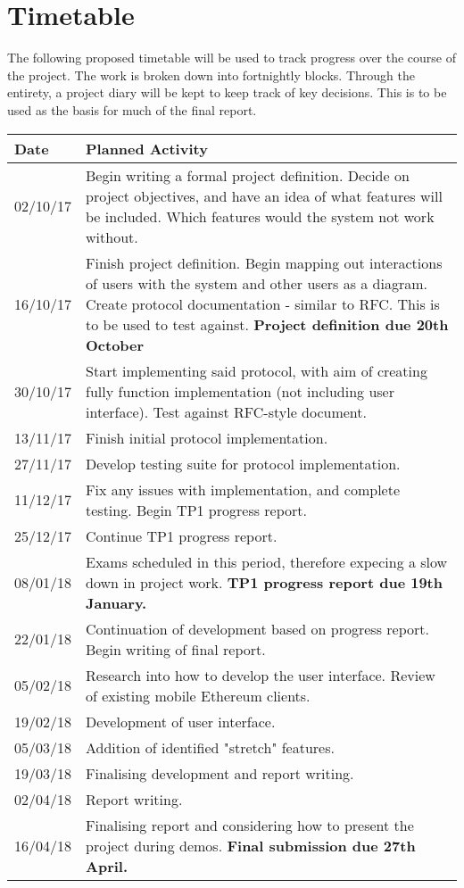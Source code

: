 \documentclass{article}
\begin{document}
\pagebreak

\section{Timetable}

The following proposed timetable will be used to track progress over the course of the project. The work is broken down into fortnightly blocks. Through the entirety, a project diary will be kept to keep track of key decisions. This is to be used as the basis for much of the final report.

\begin{center}
  \begin{tabularx}{\textwidth}{ |l|X| }
    \hline
    Date & Planned Activity \\ \hline
    02/10/17 & Begin writing a formal project definition. Decide on project objectives, and have an idea of what features will be included. Which features would the system not work without. \\
    \hline
    16/10/17 & Finish project definition. Begin mapping out interactions of users with the system and other users as a diagram. Create protocol documentation - similar to RFC. This is to be used to test against.
    \textbf{Project definition due 20th October} \\
    \hline
    30/10/17 & Start implementing said protocol, with aim of creating fully function implementation (not including user interface). Test against RFC-style document. \\
    \hline
    13/11/17 & Finish initial protocol implementation. \\
    \hline
    27/11/17 & Develop testing suite for protocol implementation. \\
    \hline
    11/12/17 & Fix any issues with implementation, and complete testing. Begin TP1 progress report. \\
    \hline
    25/12/17 & Continue TP1 progress report. \\
    \hline
    08/01/18 & Exams scheduled in this period, therefore expecing a slow down in project work.
    \textbf{TP1 progress report due 19th January.} \\
    \hline
    22/01/18 & Continuation of development based on progress report. Begin writing of final report. \\
    \hline
    05/02/18 & Research into how to develop the user interface. Review of existing mobile Ethereum clients. \\
    \hline
    19/02/18 & Development of user interface. \\
    \hline
    05/03/18 & Addition of identified "stretch" features. \\
    \hline
    19/03/18 & Finalising development and report writing. \\
    \hline
    02/04/18 & Report writing. \\
    \hline
    16/04/18 & Finalising report and considering how to present the project during demos.
    \textbf{Final submission due 27th April.} \\
    \hline
  \end{tabularx}
\end{center}
\end{document}
